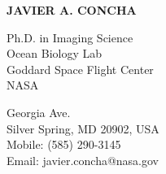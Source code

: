 \documentclass[11pt]{res} %
\begin{document}
 
{\centering \Large \bf JAVIER A. CONCHA\par} %
\vspace{0.3in}                                         
\begin{multicols}{2}
{\raggedright Ph.D. in Imaging Science \\ Ocean Biology Lab\\Goddard Space Flight Center \\ NASA\\}
{ Georgia Ave.\\Silver Spring, MD 20902, USA\\Mobile: (585) 290-3145\\Email: javier.concha@nasa.gov\\}
\end{multicols}
\vspace{-0.4in} 
\hrulefill
\end{document}
